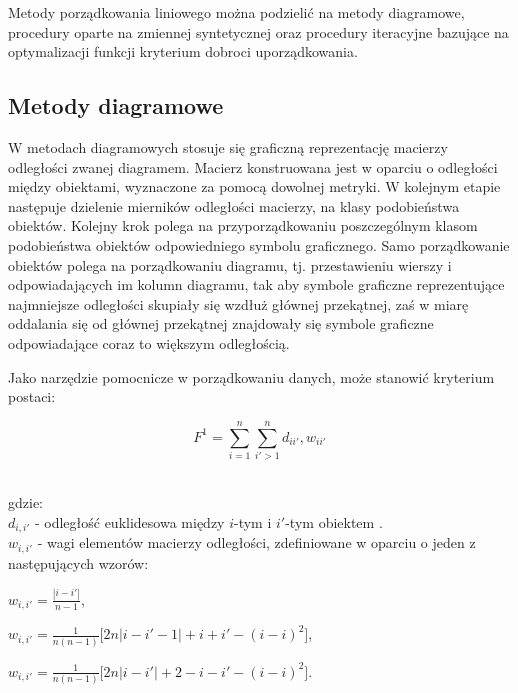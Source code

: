 \documentclass[12pt,a4paper]{report}
\begin{document}
Metody porządkowania liniowego można podzielić na metody diagramowe, procedury oparte na zmiennej syntetycznej oraz procedury iteracyjne bazujące na optymalizacji funkcji kryterium dobroci uporządkowania.

\newpage
\subsection{Metody diagramowe}
\noindent

W metodach diagramowych stosuje się graficzną reprezentację macierzy odległości zwanej diagramem. Macierz konstruowana jest w oparciu o odległości między obiektami, wyznaczone za pomocą dowolnej metryki. W kolejnym etapie następuje dzielenie mierników odległości macierzy, na klasy podobieństwa obiektów. Kolejny krok polega na przyporządkowaniu poszczególnym klasom podobieństwa obiektów odpowiedniego symbolu graficznego. Samo porządkowanie obiektów polega na porządkowaniu diagramu, tj. przestawieniu wierszy i odpowiadających im kolumn diagramu, tak aby symbole graficzne reprezentujące najmniejsze odległości skupiały się wzdłuż głównej przekątnej, zaś w miarę oddalania się od głównej przekątnej znajdowały się symbole graficzne odpowiadające coraz to większym odległością. 


Jako narzędzie pomocnicze w porządkowaniu danych, może stanowić kryterium postaci:

\begin{center}
$$F^1= \sum_{i=1}^{n} \sum_{i'>1}^{n} d_{ii'},w_{ii'}$$\\
\end{center}
gdzie:\\
 $d_{i,i'}$ - odległość euklidesowa między $i$-tym i $i'$-tym obiektem . \\
 $w_{i,i'}$ - wagi elementów macierzy odległości, zdefiniowane w oparciu o jeden z następujących wzorów: \\
 
 \begin{center}
 
 $ w_{i,i'}=\frac{| i-i' |}{n-1}$, $\qquad$ \\
   \end{center}
   \begin{center}
 $ w_{i,i'}=\frac{1}{n(n-1)}\lbrack{2n|i-i'-1|+i+i'-(i-i)^2\rbrack}$,\\
 \end{center}
 \begin{center}
 $ w_{i,i'}=\frac{1}{n(n-1)}\lbrack{2n|i-i'|+2-i-i'-(i-i)^2\rbrack}$.\\
\end{center}
\end{document}
